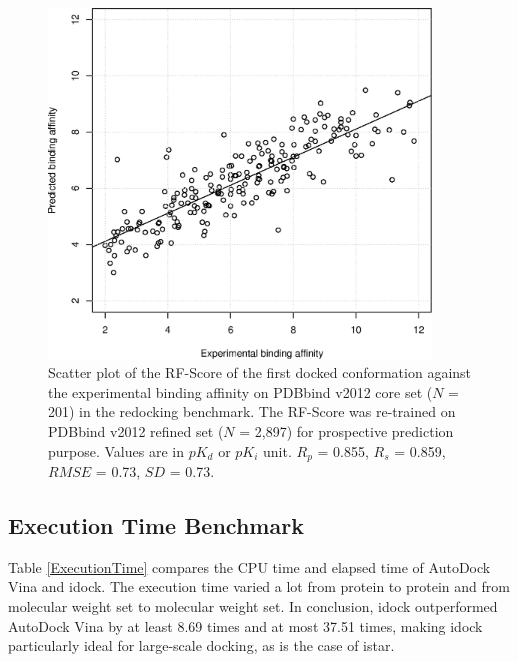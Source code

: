 \begin{figure}[!ht]
\begin{center}
\includegraphics[width=4in]{../istar/pK-idockConf1RFScore.eps}
\end{center}
\caption{Scatter plot of the RF-Score of the first docked conformation against the experimental binding affinity on PDBbind v2012 core set ($N$ = 201) in the redocking benchmark. The RF-Score was re-trained on PDBbind v2012 refined set ($N$ = 2,897) for prospective prediction purpose. Values are in $pK_d$ or $pK_i$ unit. $R_p$ = 0.855, $R_s$ = 0.859, $RMSE$ = 0.73, $SD$ = 0.73.}
\label{pK-idockConf1RFScore}
\end{figure}


\subsection{Execution Time Benchmark}
Table \ref{ExecutionTime} compares the CPU time and elapsed time of AutoDock Vina and idock. The execution time varied a lot from protein to protein and from molecular weight set to molecular weight set. In conclusion, idock outperformed AutoDock Vina by at least 8.69 times and at most 37.51 times, making idock particularly ideal for large-scale docking, as is the case of istar.

